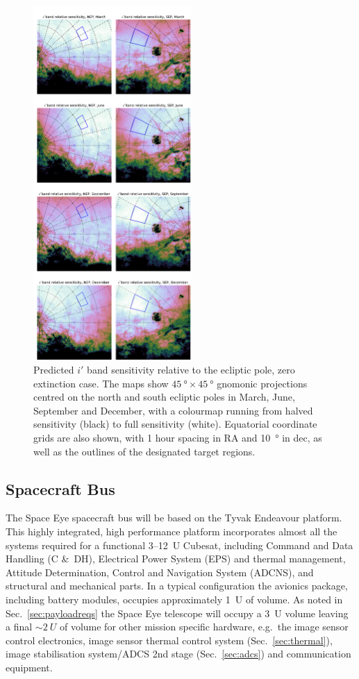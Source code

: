 \documentclass[]{iac}
\begin{document}
\begin{figure}[pt]
  \center \includegraphics[width=0.535\textwidth]{figures/i_rel_sens.pdf}
  \caption{\label{fig:sensmap}Predicted $i'$ band sensitivity relative to the ecliptic pole, zero extinction case. The
    maps show $\SI{45}{\degree}\times\SI{45}{\degree}$ gnomonic projections centred on the north and south ecliptic
    poles in March, June, September and December, with a colourmap running from halved sensitivity (black) to full
    sensitivity (white). Equatorial coordinate grids are also shown, with 1 hour spacing in RA and \SI{10}{\degree} in
    dec, as well as the outlines of the designated target regions.}
\end{figure}

\subsection{Spacecraft Bus}

The Space Eye spacecraft bus will be based on the Tyvak Endeavour platform. This highly integrated, high performance
platform incorporates almost all the systems required for a functional 3--\SI{12}{U} Cubesat, including Command and Data
Handling (C \&\ DH),  Electrical Power System (EPS) and thermal management, Attitude Determination, Control and
Navigation System (ADCNS), and structural and mechanical parts.  In a typical configuration the avionics package,
including battery modules, occupies approximately \SI{1}{U} of volume.  As noted in Sec.~\ref{sec:payloadreqs} the Space
Eye telescope will occupy a \SI{3}{U} volume leaving a final $\sim\SI{2}{U}$ of volume for other mission specific
hardware, e.g.\ the image sensor control electronics, image sensor thermal control system (Sec.~\ref{sec:thermal}),
image stabilisation system/ADCS 2nd stage (Sec.~\ref{sec:adcs}) and communication equipment.
\end{document}
